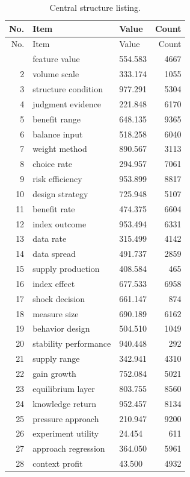 \documentclass[11pt]{report}
\begin{document}
\begin{longtable}{rllr}\caption{Central structure listing.}\label{tab:l10}\\\toprule No. & Item & Value & Count \\ \midrule \endfirsthead\toprule No. & Item & Value & Count \\ \midrule \endhead\bottomrule \endfoot
1 & feature value & 554.583 & 4667 \\
2 & volume scale & 333.174 & 1055 \\
3 & structure condition & 977.291 & 5304 \\
4 & judgment evidence & 221.848 & 6170 \\
5 & benefit range & 648.135 & 9365 \\
6 & balance input & 518.258 & 6040 \\
7 & weight method & 890.567 & 3113 \\
8 & choice rate & 294.957 & 7061 \\
9 & risk efficiency & 953.899 & 8817 \\
10 & design strategy & 725.948 & 5107 \\
11 & benefit rate & 474.375 & 6604 \\
12 & index outcome & 953.494 & 6331 \\
13 & data rate & 315.499 & 4142 \\
14 & data spread & 491.737 & 2859 \\
15 & supply production & 408.584 & 465 \\
16 & index effect & 677.533 & 6958 \\
17 & shock decision & 661.147 & 874 \\
18 & measure size & 690.189 & 6162 \\
19 & behavior design & 504.510 & 1049 \\
20 & stability performance & 940.448 & 292 \\
21 & supply range & 342.941 & 4310 \\
22 & gain growth & 752.084 & 5021 \\
23 & equilibrium layer & 803.755 & 8560 \\
24 & knowledge return & 952.457 & 8134 \\
25 & pressure approach & 210.947 & 9200 \\
26 & experiment utility & 24.454 & 611 \\
27 & approach regression & 364.050 & 5961 \\
28 & context profit & 43.500 & 4932 \\

\end{longtable}
\end{document}
